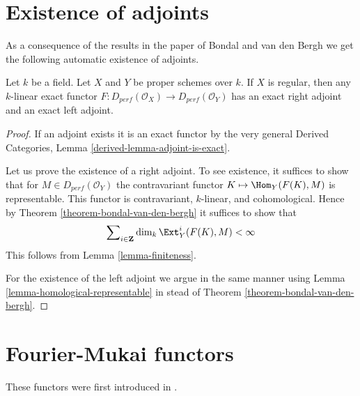 \section{Existence of adjoints}
\label{section-adjoints}

\noindent
As a consequence of the results in the paper of Bondal and van den Bergh
we get the following automatic existence of adjoints.

\begin{lemma}
\label{lemma-always-right-adjoints}
Let $k$ be a field. Let $X$ and $Y$ be proper schemes over $k$.
If $X$ is regular, then any $k$-linear exact functor
$F : D_{perf}(\mathcal{O}_X) \to D_{perf}(\mathcal{O}_Y)$
has an exact right adjoint and an exact left adjoint.
\end{lemma}

\begin{proof}
If an adjoint exists it is an exact functor by the very general
Derived Categories, Lemma \ref{derived-lemma-adjoint-is-exact}.

\medskip\noindent
Let us prove the existence of a right adjoint.
To see existence, it suffices to show that for
$M \in D_{perf}(\mathcal{O}_Y)$ the contravariant functor
$K \mapsto \Hom_Y(F(K), M)$ is representable.
This functor is contravariant, $k$-linear, and cohomological.
Hence by Theorem \ref{theorem-bondal-van-den-bergh}
it suffices to show that
$$
\sum\nolimits_{i \in \mathbf{Z}} \dim_k \Ext^i_Y(F(K), M) < \infty
$$
This follows from Lemma \ref{lemma-finiteness}.

\medskip\noindent
For the existence of the left adjoint we argue in the same
manner using Lemma \ref{lemma-homological-representable}
in stead of Theorem \ref{theorem-bondal-van-den-bergh}.
\end{proof}






\section{Fourier-Mukai functors}
\label{section-fourier-mukai}

\noindent
These functors were first introduced in \cite{Mukai}.

